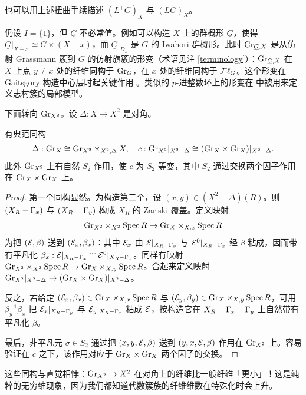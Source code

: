 \begin{rmk}
也可以用上述扭曲手续描述 $(L^+G)_X$ 与 $(LG)_X$。
\end{rmk}

仍设 $I=\{1\}$，但 $\underline G$ 不必常值。例如可以构造 $X$ 上的群概形 $\underline G$，使得 $\underline G|_{X-x}\simeq G\times (X-x)$，而 $\underline G|_{D_x}$ 是 $G$ 的 Iwahori 群概形。此时 ${\operatorname{Gr}}_{\underline G, X}$ 是从仿射 Grassmann 簇到 $G$ 的仿射旗簇的形变（术语见注 \ref{terminology}）：${\operatorname{Gr}}_{\underline G, X}$ 在 $X$ 上点 $y\neq x$ 处的纤维同构于 ${\operatorname{Gr}}_G$，在 $x$ 处的纤维同构于 ${{\mathcal F}\ell}_G$。这个形变在 Gaitsgory 构造中心层时起关键作用 \cite{Ga}。类似的 $p$-进整数环上的形变在 \cite{PZ} 中被用来定义志村簇的局部模型。

下面转向 ${\operatorname{Gr}}_{X^2}$。设 $\Delta:X\to X^2$ 是对角。

\begin{prop}\label{III:Gr2}
有典范同构
\[\Delta:{\operatorname{Gr}}_X\cong {\operatorname{Gr}}_{X^2}\times_{X^2,\Delta}X,\quad c:{\operatorname{Gr}}_{X^2}|_{X^2-\Delta}\cong ({\operatorname{Gr}}_X\times{\operatorname{Gr}}_X)|_{X^2-\Delta}.\]
此外 ${\operatorname{Gr}}_{X^2}$ 上有自然 $S_2$-作用，使 $c$ 为 $S_2$-等变，其中 $S_2$ 通过交换两个因子作用在 ${\operatorname{Gr}}_X\times{\operatorname{Gr}}_X$ 上。
\end{prop}

\begin{proof}
第一个同构显然。为构造第二个，设 $(x,y)\in (X^2-\Delta)(R)$。则 $(X_R-{\Gamma}_x)$ 与 $(X_R-{\Gamma}_y)$ 构成 $X_R$ 的 Zariski 覆盖。定义映射
\[{\operatorname{Gr}}_{X^2}\times_{X^2}\operatorname{Spec} R\to {\operatorname{Gr}}_X\times_{X,x}\operatorname{Spec} R\]
为把 $({\mathcal E},\beta)$ 送到 $({\mathcal E}_x,\beta_x)$：其中 ${\mathcal E}_x$ 由 ${\mathcal E}|_{X_R-{\Gamma}_y}$ 与 ${\mathcal E}^0|_{X_R-{\Gamma}_x}$ 经 $\beta$ 粘成，因而带有平凡化 $\beta_x: {\mathcal E}|_{X_R- {\Gamma}_x}\cong {\mathcal E}^0|_{X_R-{\Gamma}_x}$。同样有映射 ${\operatorname{Gr}}_{X^2}\times_{X^2}\operatorname{Spec} R\to {\operatorname{Gr}}_X\times_{X,y}\operatorname{Spec} R$。合起来定义映射 ${\operatorname{Gr}}_{X^2}|_{X^2-\Delta}\to ({\operatorname{Gr}}_X\times{\operatorname{Gr}}_X)|_{X^2-\Delta}$。

反之，若给定 $({\mathcal E}_x,\beta_x)\in {\operatorname{Gr}}_X\times_{X,x}\operatorname{Spec} R$ 与 $({\mathcal E}_y,\beta_y)\in {\operatorname{Gr}}_X\times_{X,y}\operatorname{Spec} R$，可用 $\beta^{-1}_y\beta_x$ 把 ${\mathcal E}_{x}|_{X_R- {\Gamma}_y}$ 与 ${\mathcal E}_y|_{X_R-{\Gamma}_x}$ 粘成 ${\mathcal E}$，按构造它在 $X_R-{\Gamma}_x-{\Gamma}_y$ 上自然带有平凡化 $\beta$。

最后，非平凡元 $\sigma\in S_2$ 通过把 $(x,y, {\mathcal E},\beta)$ 送到 $(y,x,{\mathcal E},\beta)$ 作用在 ${\operatorname{Gr}}_{X^2}$ 上。容易验证在 $c$ 之下，该作用对应于 ${\operatorname{Gr}}_X\times{\operatorname{Gr}}_X$ 两个因子的交换。
\end{proof}

这些同构与直觉相悖：${\operatorname{Gr}}_{X^2}\to X^2$ 在对角上的纤维比一般纤维「更小」！这是纯粹的无穷维现象，因为我们都知道代数簇族的纤维维数在特殊化时会上升。

